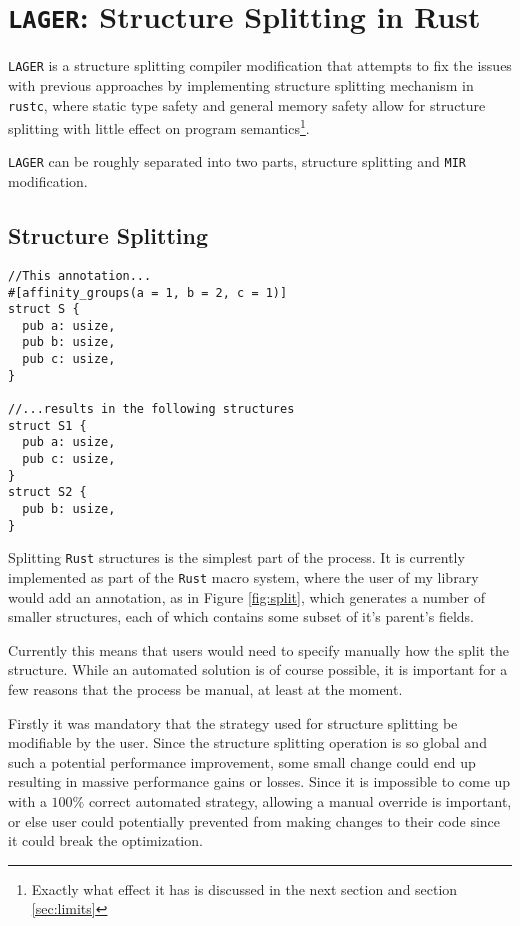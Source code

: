 \documentclass[12pt,oneside]{book}
\newcommand{\rustname}{{\texttt{Rust}}}
\def \rust {\rustname{}\xspace}
\newcommand{\rustcname}{{\texttt{rustc}}}
\def \rustc {\rustcname{}\xspace}
\newcommand{\mirname}{{\texttt{MIR}}}
\def \mir {\mirname{}\xspace}
\newcommand{\projectname}{{\texttt{LAGER}}}
\def \name{\projectname\xspace}
\begin{document}

\chapter{\name: Structure Splitting in Rust}

\name is a structure splitting compiler modification that attempts to fix the issues with
previous approaches by implementing structure splitting mechanism in \rustc, where static type
safety and general memory safety allow for structure splitting with little effect on program
semantics\footnote{Exactly what effect it has is discussed in the next section and section \ref{sec:limits}}.

\name can be roughly separated into two parts, structure splitting and
\mir modification.

\section{Structure Splitting}

\begin{figure*}
\begin{verbatim}
//This annotation...
#[affinity_groups(a = 1, b = 2, c = 1)]
struct S {
  pub a: usize,
  pub b: usize,
  pub c: usize,
}

//...results in the following structures
struct S1 {
  pub a: usize,
  pub c: usize,
}
struct S2 {
  pub b: usize,
}
\end{verbatim}
  \caption{Structure Splitting as a macro}
  \label{fig:split}
\end{figure*}

Splitting \rust structures is the simplest part of the process. It is currently
implemented as part of the \rust macro system, where the user of my library
would add an annotation, as in Figure \ref{fig:split}, which generates a number
of smaller structures, each of which contains some subset of it's parent's fields.

Currently this means
that users would need to specify manually how the split the structure. While an
automated solution is of course possible, it is important for a few reasons that
the process be manual, at least at the moment. 

Firstly it was mandatory that the strategy used for structure splitting be modifiable by the user.
Since the structure splitting operation is so global and such a potential performance improvement,
some small change could end up resulting in massive performance gains or losses. Since it is impossible
to come up with a $100\%$ correct automated strategy, allowing a manual override is important, or else
user could potentially prevented from making changes to their code
since it could break the optimization.
\end{document}
